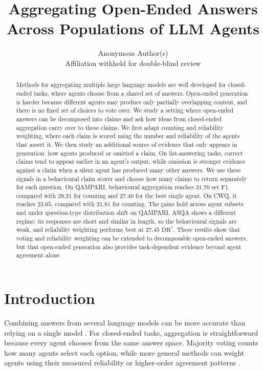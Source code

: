 \documentclass[11pt]{article}
\title{Aggregating Open-Ended Answers Across Populations of LLM Agents}
\author{%
  Anonymous Author(s) \\
  Affiliation withheld for double-blind review \\
}
\begin{document}
\maketitle

\begin{abstract}
Methods for aggregating multiple large language models are well developed for closed-ended tasks, where agents choose from a shared set of answers. Open-ended generation is harder because different agents may produce only partially overlapping content, and there is no fixed set of choices to vote over. We study a setting where open-ended answers can be decomposed into claims and ask how ideas from closed-ended aggregation carry over to these claims. We first adapt counting and reliability weighting, where each claim is scored using the number and reliability of the agents that assert it. We then study an additional source of evidence that only appears in generation: how agents produced or omitted a claim. On list-answering tasks, correct claims tend to appear earlier in an agent's output, while omission is stronger evidence against a claim when a silent agent has produced many other answers. We use these signals in a behavioural claim scorer and choose how many claims to return separately for each question. On QAMPARI, behavioural aggregation reaches $31.70$ set F1, compared with $29.21$ for counting and $27.40$ for the best single agent. On CWQ, it reaches $23.65$, compared with $21.81$ for counting. The gains hold across agent subsets and under question-type distribution shift on QAMPARI. ASQA shows a different regime: its responses are short and similar in length, so the behavioural signals are weak, and reliability weighting performs best at $27.45$ $\mathrm{DR}^*$. These results show that voting and reliability weighting can be extended to decomposable open-ended answers, but that open-ended generation also provides task-dependent evidence beyond agent agreement alone.
\end{abstract}

\section{Introduction}
\label{sec:intro}

Combining answers from several language models can be more accurate than relying on a single model \citep{li2024agents}. For closed-ended tasks, aggregation is straightforward because every agent chooses from the same answer space. Majority voting counts how many agents select each option, while more general methods can weight agents using their measured reliability or higher-order agreement patterns \citep{ai2025majority}.
\end{document}
